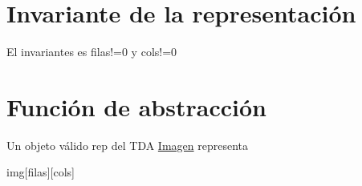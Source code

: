 \hypertarget{repMatriz2D_invMatriz2D}{}\section{Invariante de la representación}\label{repMatriz2D_invMatriz2D}
El invariantes es filas!=0 y cols!=0\hypertarget{repMatriz2D_faMatriz2D}{}\section{Función de abstracción}\label{repMatriz2D_faMatriz2D}
Un objeto válido rep del T\+DA \hyperlink{classImagen}{Imagen} representa

img\mbox{[}filas\mbox{]}\mbox{[}cols\mbox{]} 